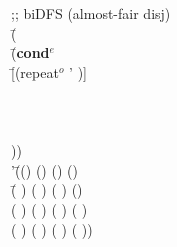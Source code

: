     \begin{ZZZZschemedisplay}%
;; biDFS (almost-fair disj)\\%
\va{$\gt$} \=(  \\%
  \>\PRN \HL \=(\textbf{cond$^e$}\\%
  \>  \>\PRN \HL \=[(repeat$^o$ ' )]\\%
  \>  \>  \>[(repeat$^o$ '\cn{b} \va{q})]\\%
  \>  \>  \>[(repeat$^o$ '\cn{c} \va{q})]\\%
  \>  \>  \>[(repeat$^o$ '\cn{d} \va{q})]\\%
  \>  \>  \>[(repeat$^o$ '\cn{e} \va{q})]))\\%
'\=(() () () ()\\%
 \>\PRN \=( ) ( ) ( ) ()\\%
 \> \>(  ) (  ) (  ) ( )\\%
 \> \>(   ) (   ) (   ) ( ))%
\end{ZZZZschemedisplay}
    